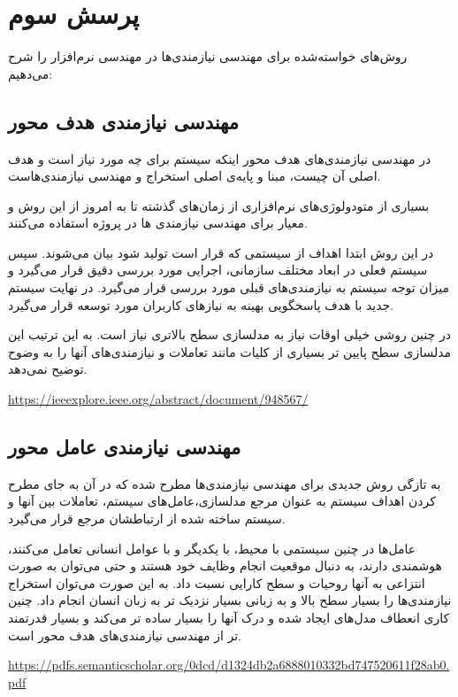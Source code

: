 
\section{پرسش سوم}
روش‌های خواسته‌شده برای مهندسی نیازمندی‌ها در مهندسی نرم‌افزار را شرح می‌دهیم:

\subsection{مهندسی نیازمندی هدف محور}
 در مهندسی نیازمندی‌های هدف محور اینکه سیستم برای چه مورد نیاز است و هدف اصلی آن چیست، مبنا و پایه‌ی اصلی استخراج و مهندسی نیازمندی‌هاست.

بسیاری از متودولوژی‌های نرم‌افزاری از زمان‌های گذشته تا به امروز از این روش و معیار برای مهندسی نیازمند‌ی ها در پروژه استفاده می‌کنند.

در این روش ابتدا اهداف از سیستمی که قرار است تولید شود بیان می‌شوند. سپس سیستم فعلی در ابعاد مختلف سازمانی، اجرایی  مورد بررسی دقیق قرار می‌گیرد و میزان توجه سیستم به نیازمندی‌های قبلی مورد بررسی قرار می‌گیرد. در نهایت سیستم جدید با هدف پاسخگویی بهینه به نیاز‌های کاربران مورد توسعه قرار می‌گیرد.

در چنین روشی خیلی اوقات  نیاز به مدلسازی سطح بالاتری نیاز است. به این ترتیب این مدلسازی سطح پایین تر بسیاری از کلیات مانند تعاملات  و نیازمندی‌های آنها را به وضوح توضیح نمی‌دهد.

\url{https://ieeexplore.ieee.org/abstract/document/948567/}

\subsection{مهندسی نیازمندی عامل محور}
به تازگی روش جدیدی برای مهندسی نیازمندی‌ها مطرح شده که در آن به جای مطرح کردن اهداف سیستم به عنوان مرجع مدلسازی،‌عامل‌های سیستم، تعاملات بین آنها و سیستم ساخته شده از ارتباطشان مرجع قرار می‌گیرد.

عامل‌ها در چنین سیستمی با محیط، با یکدیگر و با عوامل انسانی تعامل می‌کنند،‌ هوشمندی دارند،‌ به دنبال موقعیت انجام وظایف خود هستند و حتی می‌توان به صورت انتزاعی به آنها روحیات و سطح کارایی نسبت داد. به این صورت می‌توان استخراج نیازمندی‌ها را بسیار سطح بالا و به زبانی بسیار نزدیک تر به زبان انسان انجام داد. چنین کاری انعطاف مدل‌های ایجاد شده و درک آنها را بسیار ساده تر می‌کند و بسیار قدرتمند تر از مهندسی نیازمندی‌های هدف محور است.

\url{https://pdfs.semanticscholar.org/0dcd/d1324db2a6888010332bd747520611f28ab0.pdf}